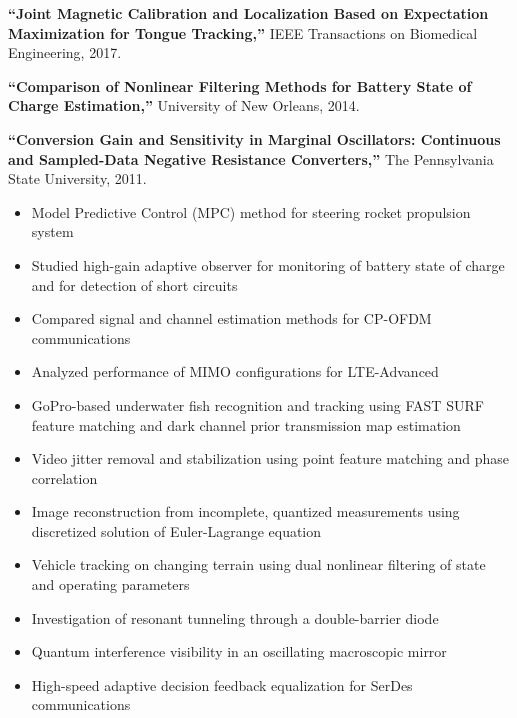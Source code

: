 \documentclass[11pt]{extarticle}
\begin{document}
\begin{description}[itemsep=-3pt,leftmargin=30.5pt,itemindent=-2em]
\item[] \textbf{``Joint Magnetic Calibration and Localization Based on Expectation Maximization for Tongue Tracking,''} IEEE Transactions on Biomedical Engineering, 2017.
\item[] \textbf{``Comparison of Nonlinear Filtering Methods for Battery State of Charge Estimation,''} University of New Orleans, 2014.
\item[] \textbf{``Conversion Gain and Sensitivity in Marginal Oscillators: Continuous and Sampled-Data Negative Resistance Converters,''} The Pennsylvania State University, 2011.
\end{description}
\vspace{-3pt}

\begin{itemize}[itemsep=-3pt]
\item Model Predictive Control (MPC) method for steering rocket propulsion system
\item Studied high-gain adaptive observer for monitoring of battery state of charge and for detection of short circuits
\item Compared signal and channel estimation methods for CP-OFDM communications
\item Analyzed performance of MIMO configurations for LTE-Advanced
\item GoPro-based underwater fish recognition and tracking using FAST SURF feature matching and dark channel prior transmission map estimation
\item Video jitter removal and stabilization using point feature matching and phase correlation
\item Image reconstruction from incomplete, quantized measurements using discretized solution of Euler-Lagrange equation
\item Vehicle tracking on changing terrain using dual nonlinear filtering of state and operating parameters
\item Investigation of resonant tunneling through a double-barrier diode
\item Quantum interference visibility in an oscillating macroscopic mirror
\item High-speed adaptive decision feedback equalization for SerDes communications
\end{itemize}
\vspace{-3pt}
\end{document}
